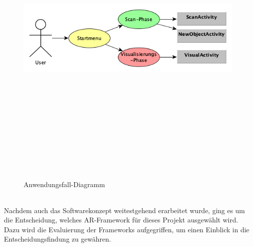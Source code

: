 \begin{figure}[hbt!]
    \centering
    \includegraphics[width=15cm,height=15cm,keepaspectratio]{3Konzeption/Bilder/Anwendungsfalldiagramm.png}
    \caption{Anwendungsfall-Diagramm}
    \label{pic:anwendungsfall}
\end{figure}
\\ 
\linebreak
Nachdem auch das Softwarekonzept weitestgehend erarbeitet wurde, ging es um die Entscheidung, welches \acl{AR}-Framework für dieses Projekt 
ausgewählt wird. Dazu wird die Evaluierung der Frameworks aufgegriffen, um einen Einblick in die Entscheidungsfindung zu gewähren.
